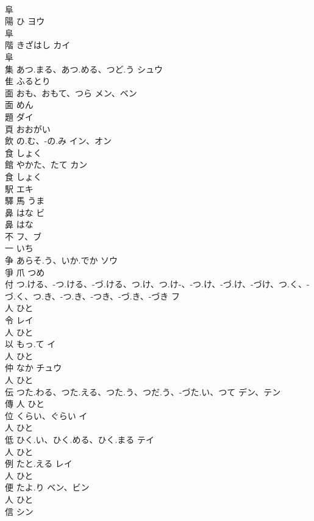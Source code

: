 \documentclass[8pt]{extreport}
\begin{document}
\begin{CJK}{UTF8}{min}
\\	阜				
\\	陽	ひ	ヨウ	
\\	阜				
\\	階	きざはし	カイ	
\\	阜				
\\	集	あつ.まる、あつ.める、つど.う	シュウ	
\\	隹		ふるとり		
\\	面	おも、おもて、つら	メン、ベン	
\\	面		めん		
\\	題		ダイ	
\\	頁		おおがい		
\\	飲	の.む、-の.み	イン、オン	
\\	食		しょく		
\\	館	やかた、たて	カン	
\\	食		しょく		
\\	駅		エキ	
\\	驛	馬		うま		
\\	鼻	はな	ビ	
\\	鼻		はな		
\\	不		フ、ブ	
\\	一		いち		
\\	争	あらそ.う、いか.でか	ソウ	
\\	爭	爪		つめ		
\\	付	つ.ける、-つ.ける、-づ.ける、つ.け、つ.け-、-つ.け、-づ.け、-づけ、つ.く、-づ.く、つ.き、-つ.き、-つき、-づ.き、-づき	フ	
\\	人		ひと		
\\	令		レイ	
\\	人		ひと		
\\	以	もっ.て	イ	
\\	人		ひと		
\\	仲	なか	チュウ	
\\	人		ひと		
\\	伝	つた.わる、つた.える、つた.う、つだ.う、-づた.い、つて	デン、テン	
\\	傳	人		ひと		
\\	位	くらい、ぐらい	イ	
\\	人		ひと		
\\	低	ひく.い、ひく.める、ひく.まる	テイ	
\\	人		ひと		
\\	例	たと.える	レイ	
\\	人		ひと		
\\	便	たよ.り	ベン、ビン	
\\	人		ひと		
\\	信		シン	

\end{CJK}
\end{document}
